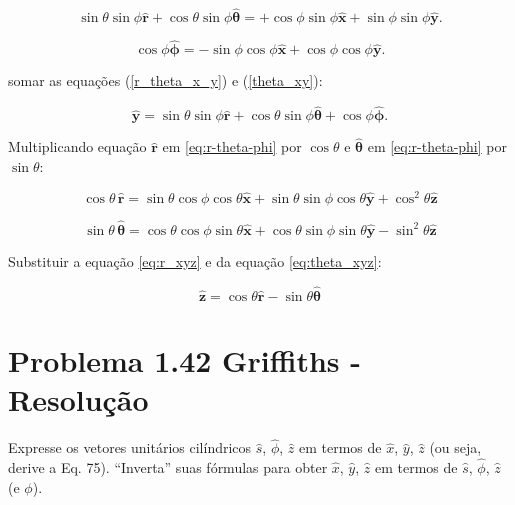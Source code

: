 \documentclass[a4paper,12pt]{article}
\begin{document}
\begin{equation}\label{r_theta_x_y}
\sin\theta \sin\phi \hat{\mathbf{r}} + \cos\theta \sin\phi \hat{\bm{\theta}} = +\cos\phi \sin\phi \hat{\mathbf{x}} + \sin\phi \sin\phi \hat{\mathbf{y}}.
\end{equation}
    
\begin{equation}\label{theta_xy}
\cos\phi\hat{\bm{\phi}} = -\sin\phi \cos\phi \hat{\mathbf{x}} + \cos\phi \cos\phi \hat{\mathbf{y}}.
\end{equation}

somar as equações (\ref{r_theta_x_y}) e (\ref{theta_xy}):

\begin{equation}
\hat{\mathbf{y}} = \sin\theta \sin\phi \hat{\mathbf{r}} + \cos\theta \sin\phi \hat{\bm{\theta}} + \cos\phi\hat{\bm{\phi}}.
\end{equation}

Multiplicando equação $\hat{\mathbf{r}}$ em  \ref{eq:r-theta-phi} por $\cos\theta$ e $\hat{\bm{\theta}}$ em \ref{eq:r-theta-phi} por $\sin\theta$:

\begin{equation}\label{eq:r_xyz}
\cos\theta \, \hat{\mathbf{r}} = \sin\theta \cos\phi \cos\theta \hat{\mathbf{x}} + \sin\theta \sin\phi \cos\theta \hat{\mathbf{y}} + \cos^{2}\theta \hat{\mathbf{z}}
\end{equation}

\begin{equation}\label{eq:theta_xyz}
\sin\theta \, \hat{\bm{\theta}} = \cos\theta \cos\phi \sin\theta \hat{\mathbf{x}} + \cos\theta \sin\phi \sin\theta \hat{\mathbf{y}} - \sin^{2}\theta  \hat{\mathbf{z}}
\end{equation}

Substituir a equa\c{c}\~ao \ref{eq:r_xyz} e da equa\c{c}\~ao \ref{eq:theta_xyz}:

\begin{equation}
\hat{\mathbf{z}} = \cos\theta \hat{\mathbf{r}} - \sin\theta \hat{\bm{\theta}}
\end{equation}


\section*{Problema 1.42 Griffiths - Resolu\c{c}\~ao}

Expresse os vetores unitários cilíndricos $\hat{s}$, $\hat{\phi}$, $\hat{z}$ em termos 
de $\hat{x}$, $\hat{y}$, $\hat{z}$ (ou seja, derive a Eq. 75). ``Inverta'' suas fórmulas 
para obter $\hat{x}$, $\hat{y}$, $\hat{z}$ em termos de $\hat{s}$, $\hat{\phi}$, $\hat{z}$ (e $\phi$).
\end{document}
